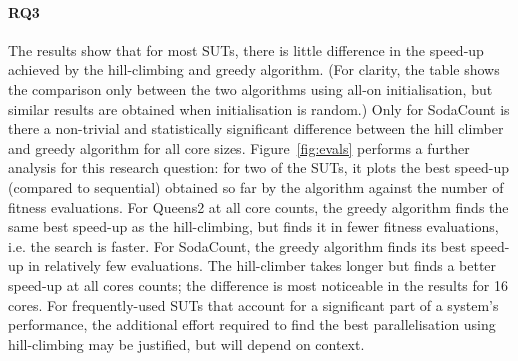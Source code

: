 \paragraph{RQ3} The results show that for most SUTs, there is little difference in the speed-up achieved by the hill-climbing and greedy algorithm.  (For clarity, the table shows the comparison only between the two algorithms using all-on initialisation, but similar results are obtained when initialisation is random.) Only for SodaCount is there a non-trivial and statistically significant difference between the hill climber and greedy algorithm for all core sizes.  Figure~\ref{fig:evals} performs a further analysis for this research question: for two of the SUTs, it plots the best speed-up (compared to sequential) obtained so far by the algorithm against the number of fitness evaluations.
For Queens2 at all core counts, the greedy algorithm finds the same best speed-up as the hill-climbing, but finds it in fewer fitness evaluations, i.e. the search is faster.  For SodaCount, the greedy algorithm finds its best speed-up in relatively few evaluations. The hill-climber takes longer but finds a better speed-up at all cores counts; the difference is most noticeable in the results for 16 cores.  For frequently-used SUTs that account for a significant part of a system's performance, the additional effort required to find the best parallelisation using hill-climbing may be justified, but will depend on context.

